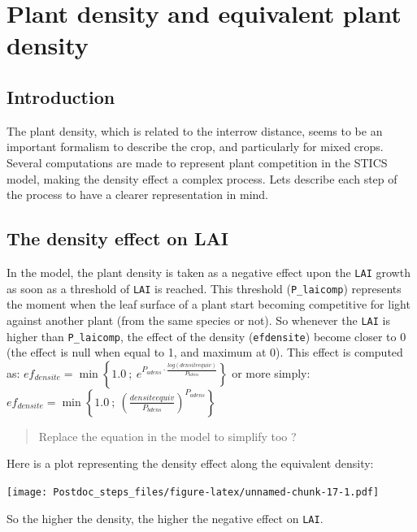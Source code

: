 \documentclass[]{book}
\begin{document}
\hypertarget{plantdensity}{%
\chapter{Plant density and equivalent plant density}\label{plantdensity}}

\hypertarget{introduction-2}{%
\section{Introduction}\label{introduction-2}}

The plant density, which is related to the interrow distance, seems to be an important formalism to describe the crop, and particularly for mixed crops. Several computations are made to represent plant competition in the STICS model, making the density effect a complex process. Lets describe each step of the process to have a clearer representation in mind.

\hypertarget{the-density-effect-on-lai}{%
\section{The density effect on LAI}\label{the-density-effect-on-lai}}

In the model, the plant density is taken as a negative effect upon the \texttt{LAI} growth as soon as a threshold of \texttt{LAI} is reached. This threshold (\texttt{P\_laicomp}) represents the moment when the leaf surface of a plant start becoming competitive for light against another plant (from the same species or not). So whenever the \texttt{LAI} is higher than \texttt{P\_laicomp}, the effect of the density (\texttt{efdensite}) become closer to 0 (the effect is null when equal to 1, and maximum at 0).
This effect is computed as:
\(ef_{densite}=\min\left\{1.0\ ;\ e^{P_{adens}\cdot\frac{log(densiteequiv)}{P_{bdens}}}\right\}\)
or more simply:
\(ef_{densite}=\min\left\{1.0\ ;\ (\frac{densiteequiv}{P_{bdens}})^{P_{adens}}\right\}\)

\begin{quote}
Replace the equation in the model to simplify too ?
\end{quote}

Here is a plot representing the density effect along the equivalent density:

\texttt{[image: Postdoc\_steps\_files/figure-latex/unnamed-chunk-17-1.pdf]}

So the higher the density, the higher the negative effect on \texttt{LAI}.
\end{document}
